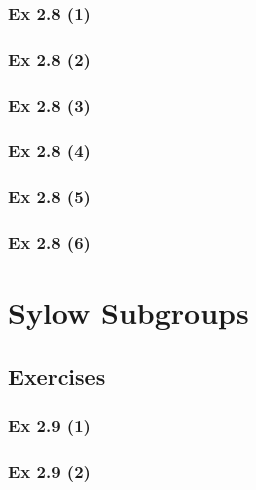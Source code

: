 \subsubsection{Ex 2.8 (1)}\label{sec:Ex_2.8.1}

\subsubsection{Ex 2.8 (2)}\label{sec:Ex_2.8.2}

\subsubsection{Ex 2.8 (3)}\label{sec:Ex_2.8.3}

\subsubsection{Ex 2.8 (4)}\label{sec:Ex_2.8.4}

\subsubsection{Ex 2.8 (5)}\label{sec:Ex_2.8.5}

\subsubsection{Ex 2.8 (6)}\label{sec:Ex_2.8.6}

\newpage		%

\section{Sylow Subgroups}\label{sec:2.9}
\subsection{Exercises}\label{sec:2.9_Exercises}

\subsubsection{Ex 2.9 (1)}\label{sec:Ex_2.9.1}

\subsubsection{Ex 2.9 (2)}\label{sec:Ex_2.9.2}


